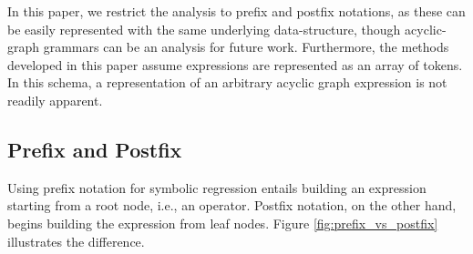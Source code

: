 \documentclass[12pt]{iopart}
\begin{document}
In this paper, we restrict the analysis to prefix and postfix notations, as these can be easily represented with the same underlying data-structure, though acyclic-graph grammars can be an analysis for future work. Furthermore, the methods developed in this paper assume expressions are represented as an array of tokens. In this schema, a representation of an arbitrary acyclic graph expression is not readily apparent.


\subsection{Prefix and Postfix}
Using prefix notation for symbolic regression entails building an expression starting from a root node, i.e., an operator. Postfix notation, on the other hand, begins building the expression from leaf nodes. Figure \ref{fig:prefix_vs_postfix} illustrates the difference.
\end{document}
